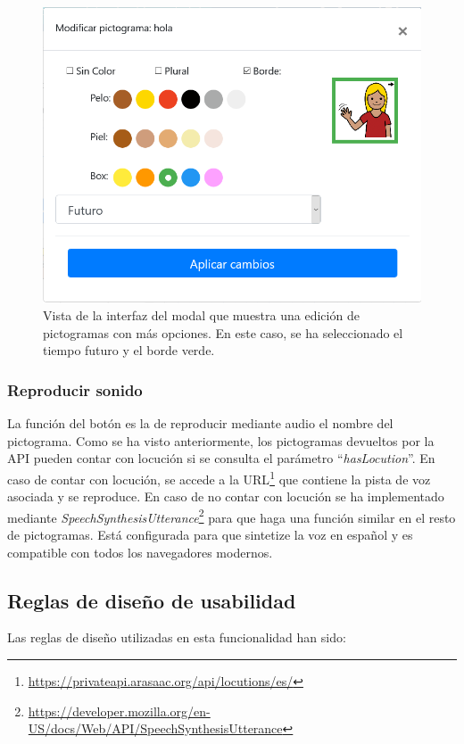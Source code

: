 \begin{figure}[h!]
	\centering
	\includegraphics[width=0.7\linewidth]{Imagenes/Bitmap/modalEditarPicto}
	\caption{Vista de la interfaz del modal que muestra una edición de pictogramas con más opciones. En este caso, se ha seleccionado el tiempo futuro y el borde verde. }
	\label{fig:modaleditarpicto}
\end{figure}


\subsubsection{Reproducir sonido}


La función del botón es la de reproducir mediante audio el nombre del pictograma. Como se ha visto anteriormente, los pictogramas devueltos por la API pueden contar con locución si se consulta el parámetro “\textit{hasLocution}”. En caso de contar con locución, se accede a la URL\footnote{\url{https://privateapi.arasaac.org/api/locutions/es/}} que contiene la pista de voz asociada y se reproduce. 
En caso de no contar con locución se ha implementado mediante \textit{SpeechSynthesisUtterance}\footnote{\url{https://developer.mozilla.org/en-US/docs/Web/API/SpeechSynthesisUtterance}} para que haga una función similar en el resto de pictogramas. Está configurada para que sintetize la voz en español y es compatible con todos los navegadores modernos.

\subsection{Reglas de diseño de usabilidad}
 Las reglas de diseño utilizadas en esta funcionalidad han sido:

